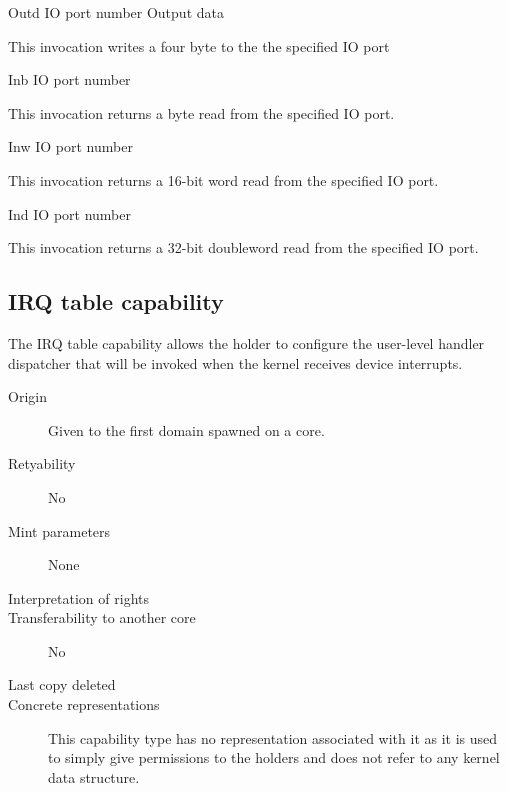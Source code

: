 \begin{invocation}{Outd}
  \arg IO port number
  \arg Output data
\end{invocation}
This invocation writes a four byte to the the specified IO port

\begin{invocation}{Inb}
  \arg IO port number
\end{invocation}
This invocation returns a byte read from the specified IO port.

\begin{invocation}{Inw}
  \arg IO port number
\end{invocation}
This invocation returns a 16-bit word read from the specified IO port.

\begin{invocation}{Ind}
  \arg IO port number
\end{invocation}
This invocation returns a 32-bit doubleword read from the specified IO port.

\subsection{IRQ table capability}
The IRQ table capability allows the holder to configure the user-level
handler dispatcher that will be invoked when the kernel receives
device interrupts.


\begin{description}
\item[Origin] Given to the first domain spawned on a core.
  
\item[Retyability] No
  
\item[Mint parameters] None
  
\item[Interpretation of rights] 
  
\item[Transferability to another core] No

\item[Last copy deleted] 
  
\item[Concrete representations] This capability type has no
  representation associated with it as it is used to simply give
  permissions to the holders and does not refer to any kernel data
  structure.
  \end{description}

